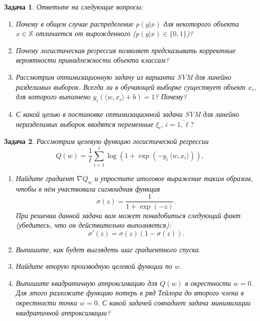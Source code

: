 \documentclass[12pt,fleqn]{article}
\newtheorem{esProblem}{Задача}
\begin{document}
\begin{esProblem}
    Ответьте на следующие вопросы:
    \begin{enumerate}
    \item Почему в общем случае распределение $p(y|x)$ для некоторого объекта $x \in \mathbb{X}$ отличается от вырожденного ($p(y|x) \in \{0,1\}$)?
    \item Почему логистическая регрессия позволяет предсказывать корректные вероятности принадлежности объекта классам?
    \item Рассмотрим оптимизационную задачу из варианта SVM для линейно разделимых выборок. Всегда ли в обучающей выборке существует объект $x_i$, для которого выполнено $y_i (\langle w, x_i \rangle + b) = 1$? Почему?
    \item С какой целью в постановке оптимизационной задачи SVM для линейно неразделимых выборок вводятся переменные $\xi_i, \, i = \overline{1, \ell}?$
    \end{enumerate}
\end{esProblem}


\begin{esProblem}
    Рассмотрим целевую функцию логистической регрессии 
    \[
    Q(w) = \frac{1}{\ell} \sum_{i=1}^{\ell} \log (1 + \exp(-y_i \, \langle w, x_i\rangle)),
    \]
    
    \begin{enumerate} 
    \item Найдите градиент $\nabla Q_w$ и упростите итоговое выражение таким образом, чтобы в нём участвовала сигмоидная функция 
    $$\sigma(z) = \frac{1}{1 + \exp(-z)}.$$ При решении данной задачи вам может понадобиться следующий факт (убедитесь, что он действительно выполняется):
    $$\sigma'(z) = \sigma(z) (1- \sigma(z)).$$ 
    \item Выпишите, как будет выглядеть шаг градиентного спуска.
    \item Найдите вторую производную целевой функции по $w$.
    \item Выпишите квадратичную аппроксимацию для $Q(w)$ в окрестности $w=0$. Для этого разложите функцию потерь в ряд Тейлора до второго члена в окрестности точки $w=0$. С какой задачей совпадает задача минимизации квадратичной аппроксимации?
    \end{enumerate} 
\end{esProblem}
\end{document}
